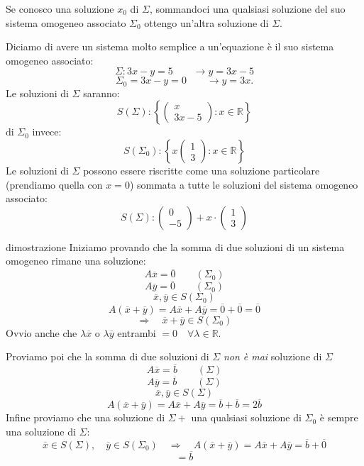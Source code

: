 \documentclass[x11names]{article}
\begin{document}
 

\noindent
Se conosco una soluzione $x_0$ di $\Sigma$, sommandoci una qualsiasi soluzione del suo sistema omogeneo associato $\Sigma_{0}$ ottengo un'altra soluzione  di $\Sigma$.

Diciamo di avere un sistema molto semplice a un'equazione è il suo sistema omogeneo associato:
\[	
\Sigma : 3x - y = 5 \qquad \rightarrow y = 3x - 5 
\] 
\[
\Sigma_{0} = 3x - y = 0 \qquad \rightarrow y = 3x
.\] 
Le soluzioni di $\Sigma$ saranno:
\[
S\left(\Sigma\right): \left\{\left(\begin{array}{c} x  \\ 3x - 5\end{array}\right): x \in \mathbb{R}\right\}
\] 
di $\Sigma_0$ invece:
\[
S\left(\Sigma_0\right): \left\{x\left(\begin{array}{c} 1  \\ 3\end{array}\right): x \in \mathbb{R}\right\}
\] 
Le soluzioni di $\Sigma$ possono essere riscritte come una soluzione particolare (prendiamo quella con  $x=0$) sommata a tutte le soluzioni del sistema omogeneo associato:
 \[
 S\left(\Sigma\right): \left(\begin{array}{c} 0 \\ -5\end{array}\right) + x\cdot \left(\begin{array}{c} 1 \\ 3\end{array}\right)
\] 

\begin{es}{dimostrazione}
Iniziamo provando che la somma di due soluzioni di un sistema omogeneo rimane una soluzione:
\[
A \overline{x} = \overline{0} \qquad \left(\Sigma_0\right)
\] 
\[
A \overline{y} = \overline{0} \qquad \left(\Sigma_0\right)
\] 
\[
	\overline{x},\overline{y} \in S\left(\Sigma_0\right)
\] 
\[
A\left(\overline{x} + \overline{y}\right) = A\overline{x} + A\overline{y} = \overline{0} + \overline{0} = \overline{0} 
\] 
\[
\Rightarrow \quad \overline{x} + \overline{y} \in S\left(\Sigma_0\right)
\] 
Ovvio anche che  $\lambda \overline{x}$ o $\lambda \overline{y}$ entrambi $=0 \quad \forall \lambda \in \mathbb{R}$.
 
Proviamo poi che la somma di due soluzioni di $\Sigma$ \textit{non è mai} soluzione di $\Sigma$
\[
A \overline{x} = \overline{b} \qquad \left(\Sigma\right)
\] 
\[
A \overline{y} = \overline{b} \qquad \left(\Sigma\right)
\] 
\[
	\overline{x},\overline{y} \in S\left(\Sigma\right)
\] 
\[
A\left(\overline{x}+\overline{y}\right) = A\overline{x} + A\overline{y} = \overline{b} + \overline{b} = 2\overline{b}
\] 
Infine proviamo che una soluzione di $\Sigma + $  una qualsiasi soluzione di  $\Sigma_{0}$ è sempre una soluzione di $\Sigma$:
 \[
\overline{x} \in S\left(\Sigma\right), \quad \overline{y} \in S\left(\Sigma_0\right) \quad \Rightarrow \quad A\left(\overline{x} + \overline{y}\right) = A\overline{x} + A\overline{y} = \overline{b} + \overline{0}
\] 
\[
 = \overline{b} 
\]
\end{es}
\end{document}
